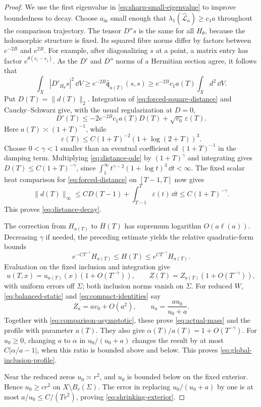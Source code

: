 \begin{proof}
We use the first eigenvalue in
\eqref{eq:sharp-small-eigenvalue} to improve boundedness
to decay. Choose \(a_{\mathrm{in}}\) small enough that
\(\lambda_1(\widehat{\mathcal L}_a)\ge c_1a\) throughout
the comparison trajectory. The tensor \(D''s\) is the
same for all \(H_\theta\), because the holomorphic
structure is fixed. Its squared fibre norms differ
by factors between \(e^{-2B}\) and \(e^{2B}\).
For example, after diagonalizing \(s\) at a point,
a matrix entry has factor \(e^{\theta(s_i-s_j)}\).
As the \(D'\) and \(D''\) norms of a Hermitian
section agree, it follows that
\[
 \int_X|D'_{H_\theta}s|^2\,\dd V
 \ge e^{-2B}\widehat{\mathfrak q}_{a(T)}(s,s)
 \ge e^{-2B}c_1a(T)\int_Xd^2\,\dd V.
\]
Put \(D(T)=\|d(T)\|_2\). Integration of
\eqref{eq:forced-square-distance} and Cauchy--Schwarz
give, with the usual regularization at \(D=0\),
\begin{equation}\label{eq:distance-ode}
 D'(T)\le-2e^{-2B}c_1a(T)D(T)+\sqrt{v_0}\,\varepsilon(T).
\end{equation}
Here \(a(T)\asymp(1+T)^{-1}\), while
\[
 \varepsilon(T)\le
 C(1+T)^{-2}(1+\log(2+T))^3.
\]
Choose \(0<\gamma<1\) smaller than an eventual
coefficient of \((1+T)^{-1}\) in the damping term.
Multiplying \eqref{eq:distance-ode} by \((1+T)^\gamma\)
and integrating gives \(D(T)\le C(1+T)^{-\gamma}\),
since
\(\int_1^\infty t^{\gamma-2}(1+\log t)^3\,\dd t<\infty\).
The fixed scalar heat comparison for
\eqref{eq:forced-distance} on \([T-1,T]\) now gives
\[
 \|d(T)\|_\infty
 \le C D(T-1)+\int_{T-1}^T\varepsilon(t)\,\dd t
 \le C(1+T)^{-\gamma}.
\]
This proves \eqref{eq:distance-decay}.

The correction from \(H_{a(T)}\) to \(\overline H(T)\)
has supremum logarithm \(O(a\ell(a))\). Decreasing
\(\gamma\) if needed, the preceding estimate yields
the relative quadratic-form bounds
\begin{equation}\label{eq:actual-static-comparison}
 e^{-CT^{-\gamma}}H_{a(T)}
 \le H(T)\le e^{CT^{-\gamma}}H_{a(T)}.
\end{equation}
Evaluation on the fixed inclusion and integration give
\[
 u(T,x)=u_{a(T)}(x)(1+O(T^{-\gamma})),\qquad
 Z(T)=Z_{a(T)}(1+O(T^{-\gamma})),
\]
with uniform errors off \(\Sigma\); both inclusion
norms vanish on \(\Sigma\).
For reduced \(W\), \eqref{eq:balanced-static} and
\eqref{eq:compact-identities} say
\[
 Z_a=av_0+O(a^2),\qquad u_a=\frac{au_0}{u_0+a}.
\]
Together with \eqref{eq:comparison-asymptotic}, these
prove \eqref{eq:actual-mass} and the profile with
parameter \(a(T)\). They also give
\(\alpha(T)/a(T)=1+O(T^{-\gamma})\).
For \(u_0\ge0\), changing \(a\) to \(\alpha\) in
\(u_0/(u_0+a)\) changes the result by at most
\(C|\alpha/a-1|\), when this ratio is bounded above
and below. This proves \eqref{eq:global-inclusion-profile}.

Near the reduced zeros \(u_0\asymp r^2\), and \(u_0\)
is bounded below on the fixed exterior. Hence
\(u_0\ge cr^2\) on \(X\setminus B_r(\Sigma)\).
The error in replacing \(u_0/(u_0+a)\) by one is
at most \(a/u_0\le C/(Tr^2)\), proving
\eqref{eq:shrinking-exterior}.
\end{proof}

